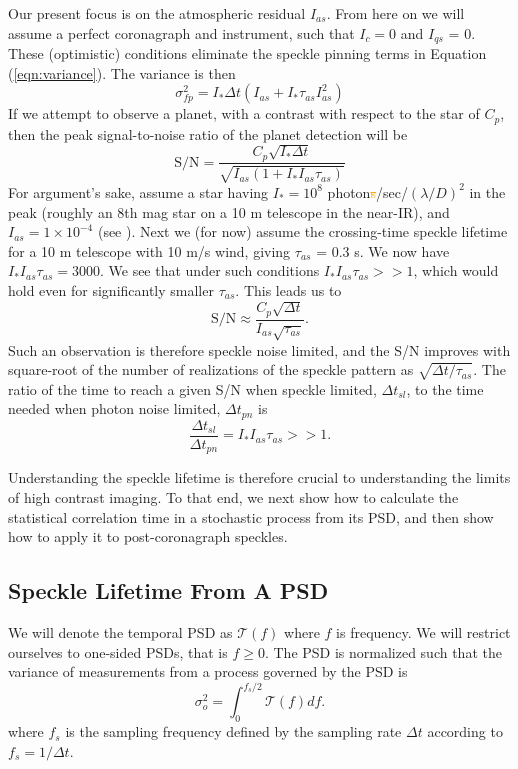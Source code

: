 \documentclass[10pt,preprint]{aastex631}
\newcommand{\ogrmv}[1]{\textcolor{orange}{\sout{#1}}}
\begin{document}
Our present focus is on the atmospheric residual $I_{as}$.  From here on we will assume a perfect coronagraph and instrument, such that $I_c = 0$ and $I_{qs}$ = 0.  These (optimistic) conditions eliminate the speckle pinning \citep{2001ApJ...558L..71B} terms in Equation (\ref{eqn:variance}).  The variance is then
\begin{equation}
\sigma^2_{fp}  = I_* \Delta t \left(I_{as} + I_* \tau_{as} I_{as}^2 \right)
\label{eqn:variance_as}
\end{equation}
If we attempt to observe a planet, with a contrast with respect to the star of $C_p$, then the peak signal-to-noise ratio of the planet detection will be
\begin{equation}
\mbox{S/N} = \frac{C_p \sqrt{I_* \Delta t}}{ \sqrt{I_{as} (1 + I_*I_{as} \tau_{as})}} 
\end{equation}
For argument's sake, assume a star having $I_* = 10^8$ photon\ogrmv{s}/sec/$(\lambda/D)^2$ in the peak (roughly an 8th mag star on a 10 m telescope in the near-IR), and $I_{as} = 1\times10^{-4}$ (see \citet{2018JATIS...4a9001M}).  Next we (for now) assume the \citet{2005SPIE.5903..170M} crossing-time speckle lifetime for a 10 m telescope with 10 m/s wind, giving $\tau_{as}$ = 0.3 s.  We now have $I_*I_{as} \tau_{as} = 3000$.  We see that under such conditions  $I_*I_{as} \tau_{as} >> 1$, which would hold even for significantly smaller $\tau_{as}$.  This leads us to
\begin{equation}
\mbox{S/N} \approx \frac{C_p \sqrt{\Delta t}}{ I_{as} \sqrt{\tau_{as}}}. 
\end{equation}
Such an observation is therefore speckle noise limited, and the S/N improves with square-root of the number of realizations of the speckle pattern as $\sqrt{\Delta t/ \tau_{as}}$.  The ratio of the time to reach a given S/N when speckle limited, $\Delta t_{sl}$, to the time needed when photon noise limited, $\Delta t_{pn}$ is
\begin{equation}
\frac{\Delta t_{sl}}{\Delta t_{pn}} = I_*I_{as} \tau_{as} >> 1.
\label{eqn:relexptime}
\end{equation}

Understanding the speckle lifetime is therefore crucial to understanding the limits of high contrast imaging.  To that end, we next show how to calculate the statistical correlation time in a stochastic process from its PSD, and then show how to apply it to post-coronagraph speckles.


\subsection{Speckle Lifetime From A PSD}
\label{sec:psd_lifetime}
We will denote the temporal PSD as $\mathcal{T}(f)$ where $f$ is frequency.  We will restrict ourselves to one-sided PSDs, that is $f \ge 0$.  The PSD is normalized such that the variance of measurements from a process governed by the PSD is
\begin{equation}
\sigma_o^2 = \int_{0}^{f_s/2} \mathcal{T}(f) df.
\label{eqn:process_var}
\end{equation}
where $f_s$ is the sampling frequency defined by the sampling rate $\Delta t$ according to $f_s = 1/\Delta t$.
\end{document}
